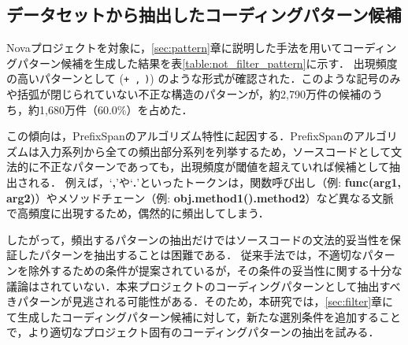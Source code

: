 \documentclass[submit,techrep,noauthor]{ipsj}
\begin{document}
\subsection{データセットから抽出したコーディングパターン候補}\label{subsec:difficult}
Novaプロジェクトを対象に，\ref{sec:pattern}章に説明した手法を用いてコーディングパターン候補を生成した結果を表\ref{table:not_filter_pattern}に示す．
出現頻度の高いパターンとして (\colorbox{lightgray!50}{\texttt{+ ,}} \colorbox{lightgray!50}{\texttt{)}}) のような形式が確認された．このような記号のみや括弧が閉じられていない不正な構造のパターンが，約2,790万件の候補のうち，約1,680万件（60.0\%）を占めた．

この傾向は，PrefixSpanのアルゴリズム特性に起因する．PrefixSpanのアルゴリズムは入力系列から全ての頻出部分系列を列挙するため，ソースコードとして文法的に不正なパターンであっても，出現頻度が閾値を超えていれば候補として抽出される．
例えば，`\textbf{,}'や`\textbf{.}'といったトークンは，関数呼び出し（例: \textbf{func(arg1, arg2)}）やメソッドチェーン（例: \textbf{obj.method1().method2}）など異なる文脈で高頻度に出現するため，偶然的に頻出してしまう．

したがって，頻出するパターンの抽出だけではソースコードの文法的妥当性を保証したパターンを抽出することは困難である．
従来手法では，不適切なパターンを除外するための条件が提案されているが，その条件の妥当性に関する十分な議論はされていない．本来プロジェクトのコーディングパターンとして抽出すべきパターンが見逃される可能性がある．そのため，本研究では，\ref{sec:filter}章にて生成したコーディングパターン候補に対して，新たな選別条件を追加することで，より適切なプロジェクト固有のコーディングパターンの抽出を試みる．
\end{document}
